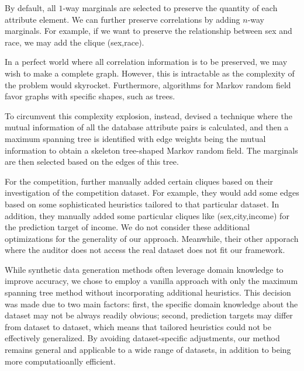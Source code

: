\documentclass[manuscript,screen,review,anonymous]{acmart}
\begin{document}
By default, all $1$-way marginals are selected to preserve the quantity of each attribute element. We can further preserve correlations by adding $n$-way marginals. For example, if we want to preserve the relationship between sex and race, we may add the clique (sex,race).

In a perfect world where all correlation information is to be preserved, we may wish to make a complete graph. However, this is intractable as the complexity of the problem would skyrocket. Furthermore, algorithms for Markov random field favor graphs with specific shapes, such as trees.

To circumvent this complexity explosion, instead, \cite{mckenna2021winning} devised a technique where the mutual information of all the database attribute pairs is calculated, and then a maximum spanning tree is identified with edge weights being the mutual information to obtain a skeleton tree-shaped Markov random field. The marginals are then selected based on the edges of this tree.

For the competition, \cite{mckenna2021winning} further manually added certain cliques based on their investigation of the competition dataset. For example, they would add some edges based on some sophisticated heuristics tailored to that particular dataset. In addition, they manually added some particular cliques like (sex,city,income) for the prediction target of income. We do not consider these additional optimizations for the generality of our approach. Meanwhile, their other apporach where the auditor does not access the real dataset does not fit our framework.

While synthetic data generation methods often leverage domain knowledge to improve accuracy, we chose to employ a vanilla approach with only the maximum spanning tree method without incorporating additional heuristics. This decision was made due to two main factors: first, the specific domain knowledge about the dataset may not be always readily obvious; second, prediction targets may differ from dataset to dataset, which means that tailored heuristics could not be effectively generalized. By avoiding dataset-specific adjustments, our method remains general and applicable to a wide range of datasets, in addition to being more computatioanlly efficient.

\end{document}
